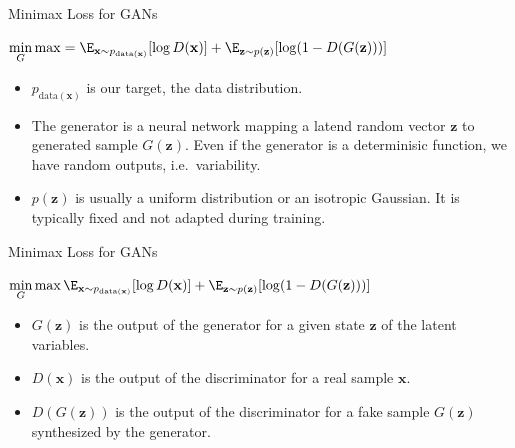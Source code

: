 \documentclass[11pt,compress,t,notes=noshow, xcolor=table]{beamer}
\begin{document}
\begin{frame} {Minimax Loss for GANs}
  \begin{tcolorbox}
  $\min \limits_G \max  %
  = \E_{\mathbf{x}\sim p_{\text{data}(\mathbf{x})}}[\log D(\mathbf{x})] + \E_{\mathbf{z}\sim p(\mathbf{z})}[\log (1 - D(G(\mathbf{z})))]$
  \end{tcolorbox}
   \begin{itemize}
  \vspace{6mm}
      \item $p_{\text{data}(\mathbf{x})}$ is our target, the data distribution.
  \vspace{6mm}
  \item The generator is a neural network mapping a latend random vector $\mathbf{z}$ to generated sample $G(\mathbf{z})$. Even if the generator is a determinisic function, we have random outputs, i.e.~variability. 
  \vspace{6mm}
      \item $p(\mathbf{z})$ is usually a uniform distribution or an isotropic Gaussian. It is typically fixed and not adapted during training.

   \end{itemize}
\end{frame}

\begin{frame} {Minimax Loss for GANs}
  \begin{tcolorbox}
    $\min \limits_G \max %
    \E_{\mathbf{x}\sim p_{\text{data}(\mathbf{x})}}[\log D(\mathbf{x})] + \E_{\mathbf{z}\sim p(\mathbf{z})}[\log (1 - D(G(\mathbf{z})))]$
  \end{tcolorbox}
  \begin{itemize}
  \vspace{6mm}
    \item $G(\mathbf{z})$ is the output of the generator for a given state $\mathbf{z}$ of the latent variables.
  \vspace{6mm}
      \item $D(\mathbf{x})$ is the output of the discriminator for a real sample $\mathbf{x}$.
  \vspace{6mm}
      \item $D(G(\mathbf{z}))$ is the output of the discriminator for a fake sample $G(\mathbf{z})$ synthesized by the generator.
  \end{itemize}
\end{frame}
\end{document}

